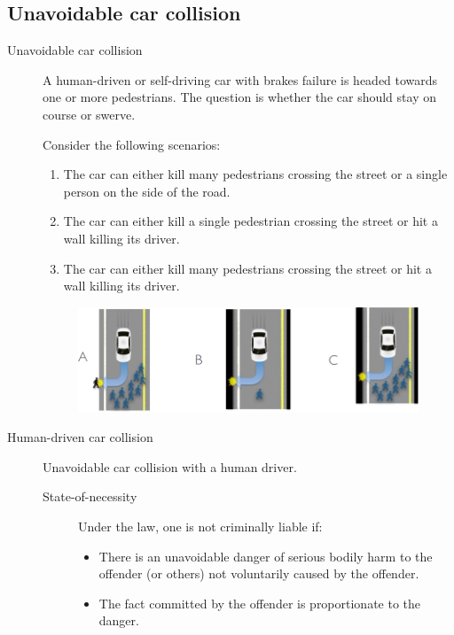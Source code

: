 \subsection{Unavoidable car collision}

\begin{description}
    \item[Unavoidable car collision] 
        A human-driven or self-driving car with brakes failure is headed towards one or more pedestrians. The question is whether the car should stay on course or swerve.

        Consider the following scenarios:
        \begin{enumerate}[label=(\Alph*)]
            \item The car can either kill many pedestrians crossing the street or a single person on the side of the road.
            \item The car can either kill a single pedestrian crossing the street or hit a wall killing its driver.
            \item The car can either kill many pedestrians crossing the street or hit a wall killing its driver.
        \end{enumerate}

        \begin{figure}[H]
            \centering
            \includegraphics[width=0.8\linewidth]{./img/human_driving_crash.png}
        \end{figure}


    
    \item[Human-driven car collision] 
        Unavoidable car collision with a human driver.

        \begin{description}
            \item[State-of-necessity] 
                Under the law, one is not criminally liable if:
                \begin{itemize}
                    \item There is an unavoidable danger of serious bodily harm to the offender (or others) not voluntarily caused by the offender.
                    \item The fact committed by the offender is proportionate to the danger.
                \end{itemize}
        

\end{description}
\end{description}
